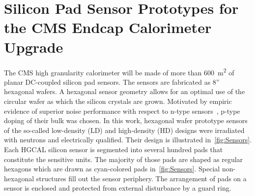 \section{Silicon Pad Sensor Prototypes for the CMS Endcap Calorimeter Upgrade}
\label{sec:sensors}

The CMS high granularity calorimeter will be made of more than \SI{600}{\metre\squared} of planar DC-coupled silicon pad sensors.
The sensors are fabricated as 8'' hexagonal wafers.
A hexagonal sensor geometry allows for an optimal use of the circular wafer as which the silicon crystals are grown.
Motivated by empiric evidence of superior noise performance with respect to n-type sensors~\cite{Adam_2017}, p-type doping of their bulk was chosen.\newline
In this work, hexagonal wafer prototype sensors of the so-called low-density (LD) and high-density (HD) designs were irradiated with neutrons and electrically qualified.
Their design is illustrated in~\ref{fig:Sensors}.
Each HGCAL silicon sensor is segmented into several hundred pads that constitute the sensitive units. 
The majority of those pads are shaped as regular hexagons which are drawn as cyan-colored pads in~\ref{fig:Sensors}.
Special non-hexagonal structures fill out the sensor periphery.
The arrangement of pads on a sensor is enclosed and protected from external disturbance by a guard ring.
